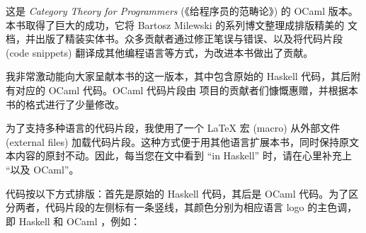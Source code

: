 
\lettrine[lhang=0.17]{这}{是} \emph{Category Theory for Programmers} (《给程序员的范畴论》) 的 OCaml 版本。本书取得了巨大的成功，它将 Bartosz Milewski 的系列博文整理成排版精美的  文档，并出版了精装实体书。众多贡献者通过修正笔误与错误、以及将代码片段 (code snippets) 翻译成其他编程语言等方式，为改进本书做出了贡献。

我非常激动能向大家呈献本书的这一版本，其中包含原始的 Haskell 代码，其后附有对应的 OCaml 代码。OCaml 代码片段由  项目的贡献者们慷慨惠赠，并根据本书的格式进行了少量修改。

为了支持多种语言的代码片段，我使用了一个 \LaTeX{} 宏 (macro) 从外部文件 (external files) 加载代码片段。这种方式便于用其他语言扩展本书，同时保持原文本内容的原封不动。因此，每当您在文中看到 “in Haskell” 时，请在心里补充上 “以及 OCaml”。

代码按以下方式排版：首先是原始的 Haskell 代码，其后是 OCaml 代码。为了区分两者，代码片段的左侧标有一条竖线，其颜色分别为相应语言 logo 的主色调，即 Haskell  和 OCaml ，例如：

\unskip
{}
\NoIndentAfterThis